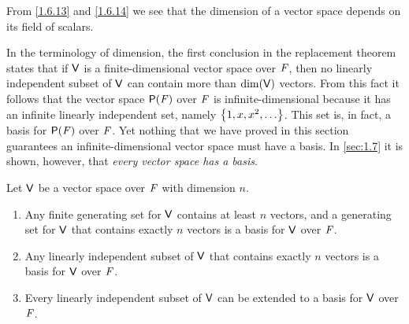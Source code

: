 \begin{note}
	From \cref{1.6.13} and \cref{1.6.14} we see that the dimension of a vector space depends on its field of scalars.
\end{note}

\begin{note}
	In the terminology of dimension, the first conclusion in the replacement theorem states that if \(\mathsf{V}\) is a finite-dimensional vector space over \(\mathit{F}\), then no linearly independent subset of \(\mathsf{V}\) can contain more than \(\dim(\mathsf{V})\) vectors.
	From this fact it follows that the vector space \(\ps{\F}\) over \(\mathit{F}\) is infinite-dimensional because it has an infinite linearly independent set, namely \(\set{1, x, x^2, \dots}\).
	This set is, in fact, a basis for \(\ps{\F}\) over \(\mathit{F}\).
	Yet nothing that we have proved in this section guarantees an infinite-dimensional vector space must have a basis.
	In \cref{sec:1.7} it is shown, however, that \emph{every vector space has a basis}.
\end{note}

\begin{cor}\label{1.6.15}
	Let \(\mathsf{V}\) be a vector space over \(\mathit{F}\) with dimension \(n\).
	\begin{enumerate}
		\item Any finite generating set for \(\mathsf{V}\) contains at least \(n\) vectors, and a generating set for \(\mathsf{V}\) that contains exactly \(n\) vectors is a basis for \(\mathsf{V}\) over \(\mathit{F}\).
		\item Any linearly independent subset of \(\mathsf{V}\) that contains exactly \(n\) vectors is a basis for \(\mathsf{V}\) over \(\mathit{F}\).
		\item Every linearly independent subset of \(\mathsf{V}\) can be extended to a basis for \(\mathsf{V}\) over \(\mathit{F}\).
	\end{enumerate}
\end{cor}

